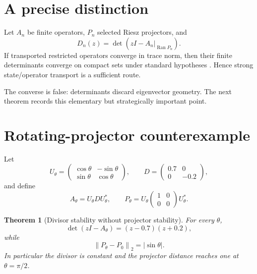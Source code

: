 \documentclass[12pt]{article}
\newtheorem{theorem}{Theorem}[section]\newtheorem{proposition}[theorem]{Proposition}
\theoremstyle{remark}\newtheorem{remark}[theorem]{Remark}
\newcommand{\norm}[1]{\left\lVert#1\right\rVert}
\begin{document}
\section{A precise distinction}

Let $A_n$ be finite operators, $P_n$ selected Riesz projectors, and
\begin{equation}\label{eq:divisor}
 D_n(z)=\det(zI-A_n|_{\operatorname{Ran}P_n}).
\end{equation}
If transported restricted operators converge in trace norm, then their
finite determinants converge on compact sets under standard hypotheses
\citep{Simon2005}.  Hence strong state/operator transport is a sufficient
route.

The converse is false: determinants discard eigenvector geometry.  The next
theorem records this elementary but strategically important point.

\section{Rotating-projector counterexample}

Let
\begin{equation}\label{eq:rotation}
 U_\theta=\begin{pmatrix}\cos\theta&-\sin\theta\\
 \sin\theta&\cos\theta\end{pmatrix},\qquad
 D=\begin{pmatrix}0.7&0\\0&-0.2\end{pmatrix},
\end{equation}
and define
\begin{equation}\label{eq:family}
 A_\theta=U_\theta DU_\theta^*,\qquad
 P_\theta=U_\theta\begin{pmatrix}1&0\\0&0\end{pmatrix}U_\theta^*.
\end{equation}

\begin{theorem}[Divisor stability without projector stability]\label{thm:counterexample}
For every $\theta$,
\begin{equation}\label{eq:fixed-divisor}
 \det(zI-A_\theta)=(z-0.7)(z+0.2),
\end{equation}
while
\begin{equation}\label{eq:projector-drift}
 \norm{P_\theta-P_0}_2=|\sin\theta|.
\end{equation}
In particular the divisor is constant and the projector distance reaches one
at $\theta=\pi/2$.
\end{theorem}
\end{document}
